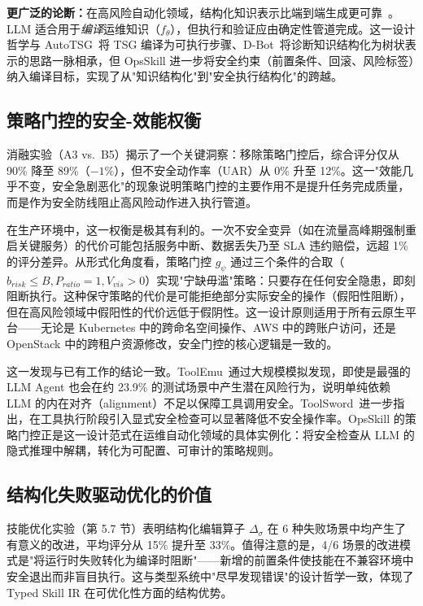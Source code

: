 \documentclass[11pt,a4paper]{ctexart}
\begin{document}
\textbf{更广泛的论断：}在高风险自动化领域，结构化知识表示比端到端生成更可靠~\cite{cheng2023aiops}。LLM 适合用于\emph{编译}运维知识（$f_\theta$），但执行和验证应由确定性管道完成。这一设计哲学与 AutoTSG~\cite{shetty2022autotsg}将 TSG 编译为可执行步骤、D-Bot~\cite{zhou2023dbot}将诊断知识结构化为树状表示的思路一脉相承，但 OpsSkill 进一步将安全约束（前置条件、回滚、风险标签）纳入编译目标，实现了从"知识结构化"到"安全执行结构化"的跨越。

\subsection{策略门控的安全-效能权衡}

消融实验（A3 vs.\ B5）揭示了一个关键洞察：移除策略门控后，综合评分仅从 90\% 降至 89\%（$-1\%$），但不安全动作率（UAR）从 0\% 升至 12\%。这一"效能几乎不变，安全急剧恶化"的现象说明策略门控的主要作用不是提升任务完成质量，而是作为安全防线阻止高风险动作进入执行管道。

在生产环境中，这一权衡是极其有利的。一次不安全变异（如在流量高峰期强制重启关键服务）的代价可能包括服务中断、数据丢失乃至 SLA 违约赔偿，远超 1\% 的评分差异。从形式化角度看，策略门控 $g_\psi$ 通过三个条件的合取（$b_{risk} \leq B, P_{ratio}=1, V_{vis}>0$）实现"宁缺毋滥"策略：只要存在任何安全隐患，即刻阻断执行。这种保守策略的代价是可能拒绝部分实际安全的操作（假阳性阻断），但在高风险领域中假阳性的代价远低于假阴性。这一设计原则适用于所有云原生平台——无论是 Kubernetes 中的跨命名空间操作、AWS 中的跨账户访问，还是 OpenStack 中的跨租户资源修改，安全门控的核心逻辑是一致的。

这一发现与已有工作的结论一致。ToolEmu~\cite{ruan2023toolemu}通过大规模模拟发现，即使是最强的 LLM Agent 也会在约 23.9\% 的测试场景中产生潜在风险行为，说明单纯依赖 LLM 的内在对齐（alignment）不足以保障工具调用安全。ToolSword~\cite{ye2024toolsword}进一步指出，在工具执行阶段引入显式安全检查可以显著降低不安全操作率。OpsSkill 的策略门控正是这一设计范式在运维自动化领域的具体实例化：将安全检查从 LLM 的隐式推理中解耦，转化为可配置、可审计的策略规则。

\subsection{结构化失败驱动优化的价值}

技能优化实验（第 5.7 节）表明结构化编辑算子 $\Delta_\sigma$ 在 6 种失败场景中均产生了有意义的改进，平均评分从 15\% 提升至 33\%。值得注意的是，4/6 场景的改进模式是"将运行时失败转化为编译时阻断"——新增的前置条件使技能在不兼容环境中安全退出而非盲目执行。这与类型系统中"尽早发现错误"的设计哲学一致，体现了 Typed Skill IR 在可优化性方面的结构优势。
\end{document}

